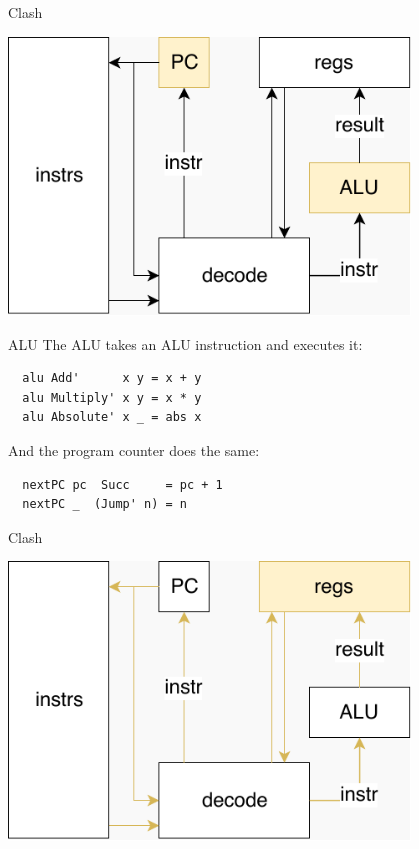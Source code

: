 \documentclass[10pt]{beamer}
\begin{document}
\begin{frame}[fragile]{Clash}
\begin{center}
\includegraphics[width=0.8\textwidth]{img/CPU-ALU-PC.pdf}
\end{center}
\end{frame}

\begin{frame}[fragile]{ALU}
The ALU takes an ALU instruction and executes it:

  \begin{verbatim}
  alu Add'      x y = x + y
  alu Multiply' x y = x * y
  alu Absolute' x _ = abs x
  \end{verbatim}
  
\pause
  
And the program counter does the same:

  \begin{verbatim}
  nextPC pc  Succ     = pc + 1
  nextPC _  (Jump' n) = n
  \end{verbatim}
\end{frame}

\begin{frame}[fragile]{Clash}
\begin{center}
\includegraphics[width=0.8\textwidth]{img/CPU-misc.pdf}
\end{center}
\end{frame}
\end{document}
